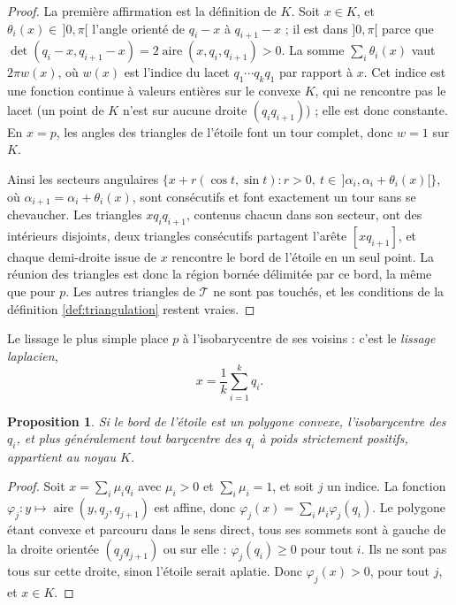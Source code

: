 \documentclass[11pt,a4paper]{article}
\theoremstyle{plain}
\newtheorem{proposition}[theoreme]{Proposition}
\theoremstyle{definition}
\theoremstyle{remark}
\DeclareMathOperator{\aire}{aire}
\begin{document}
\begin{proof}
La première affirmation est la définition de $K$. Soit $x\in K$, et $\theta_i(x)\in\,]0,\pi[$ l'angle orienté de $q_i-x$ à $q_{i+1}-x$ ; il est dans $]0,\pi[$ parce que $\det(q_i-x,q_{i+1}-x)=2\aire(x,q_i,q_{i+1})>0$. La somme $\sum_i\theta_i(x)$ vaut $2\pi w(x)$, où $w(x)$ est l'indice du lacet $q_1\cdots q_kq_1$ par rapport à $x$. Cet indice est une fonction continue à valeurs entières sur le convexe $K$, qui ne rencontre pas le lacet (un point de $K$ n'est sur aucune droite $(q_iq_{i+1})$) ; elle est donc constante. En $x=p$, les angles des triangles de l'étoile font un tour complet, donc $w=1$ sur $K$.

Ainsi les secteurs angulaires $\{x+r(\cos t,\sin t):r>0,\ t\in\,]\alpha_i,\alpha_i+\theta_i(x)[\}$, où $\alpha_{i+1}=\alpha_i+\theta_i(x)$, sont consécutifs et font exactement un tour sans se chevaucher. Les triangles $xq_iq_{i+1}$, contenus chacun dans son secteur, ont des intérieurs disjoints, deux triangles consécutifs partagent l'arête $[xq_{i+1}]$, et chaque demi-droite issue de $x$ rencontre le bord de l'étoile en un seul point. La réunion des triangles est donc la région bornée délimitée par ce bord, la même que pour $p$. Les autres triangles de $\mathcal T$ ne sont pas touchés, et les conditions de la définition \ref{def:triangulation} restent vraies.
\end{proof}

Le lissage le plus simple place $p$ à l'isobarycentre de ses voisins : c'est le \emph{lissage laplacien},
\[
  x=\frac1k\sum_{i=1}^kq_i.
\]

\begin{proposition}\label{prop:laplacien-convexe}
Si le bord de l'étoile est un polygone convexe, l'isobarycentre des $q_i$, et plus généralement tout barycentre des $q_i$ à poids strictement positifs, appartient au noyau $K$.
\end{proposition}

\begin{proof}
Soit $x=\sum_i\mu_iq_i$ avec $\mu_i>0$ et $\sum_i\mu_i=1$, et soit $j$ un indice. La fonction $\varphi_j:y\mapsto\aire(y,q_j,q_{j+1})$ est affine, donc $\varphi_j(x)=\sum_i\mu_i\varphi_j(q_i)$. Le polygone étant convexe et parcouru dans le sens direct, tous ses sommets sont à gauche de la droite orientée $(q_jq_{j+1})$ ou sur elle : $\varphi_j(q_i)\geq0$ pour tout $i$. Ils ne sont pas tous sur cette droite, sinon l'étoile serait aplatie. Donc $\varphi_j(x)>0$, pour tout $j$, et $x\in K$.
\end{proof}
\end{document}

